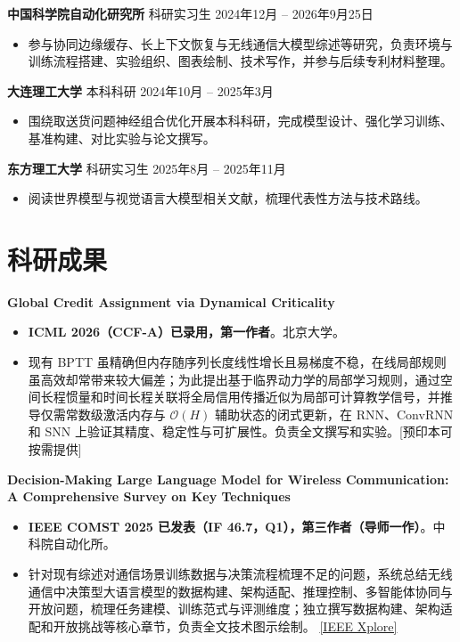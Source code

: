 \documentclass[a4paper,10pt]{ctexart}
\begin{document}
\noindent\textbf{中国科学院自动化研究所} \quad 科研实习生 \hfill 2024年12月 -- 2026年9月25日
\begin{itemize}[leftmargin=1.25em, itemsep=0.08em, topsep=0.06em, parsep=0pt]
    \item 参与协同边缘缓存、长上下文恢复与无线通信大模型综述等研究，负责环境与训练流程搭建、实验组织、图表绘制、技术写作，并参与后续专利材料整理。
\end{itemize}
\vspace{0.04em}

\noindent\textbf{大连理工大学} \quad 本科科研 \hfill 2024年10月 -- 2025年3月
\begin{itemize}[leftmargin=1.25em, itemsep=0.08em, topsep=0.06em, parsep=0pt]
    \item 围绕取送货问题神经组合优化开展本科科研，完成模型设计、强化学习训练、基准构建、对比实验与论文撰写。
\end{itemize}
\vspace{0.04em}

\noindent\textbf{东方理工大学} \quad 科研实习生 \hfill 2025年8月 -- 2025年11月
\begin{itemize}[leftmargin=1.25em, itemsep=0.08em, topsep=0.06em, parsep=0pt]
    \item 阅读世界模型与视觉语言大模型相关文献，梳理代表性方法与技术路线。
\end{itemize}

\section{科研成果}
\noindent\textbf{Global Credit Assignment via Dynamical Criticality}
\begin{itemize}[leftmargin=1.15em, itemsep=0.02em, topsep=0.03em, parsep=0pt]
    \item \textbf{ICML 2026（CCF-A）已录用，第一作者}。北京大学。
    \item 现有 BPTT 虽精确但内存随序列长度线性增长且易梯度不稳，在线局部规则虽高效却常带来较大偏差；为此提出基于临界动力学的局部学习规则，通过空间长程惯量和时间长程关联将全局信用传播近似为局部可计算教学信号，并推导仅需常数级激活内存与 $\mathcal{O}(H)$ 辅助状态的闭式更新，在 RNN、ConvRNN 和 SNN 上验证其精度、稳定性与可扩展性。负责全文撰写和实验。[预印本可按需提供]
\end{itemize}
\vspace{0.03em}

\noindent\textbf{Decision-Making Large Language Model for Wireless Communication: A Comprehensive Survey on Key Techniques}
\begin{itemize}[leftmargin=1.15em, itemsep=0.02em, topsep=0.03em, parsep=0pt]
    \item \textbf{IEEE COMST 2025 已发表（IF 46.7，Q1），第三作者（导师一作）}。中科院自动化所。
    \item 针对现有综述对通信场景训练数据与决策流程梳理不足的问题，系统总结无线通信中决策型大语言模型的数据构建、架构适配、推理控制、多智能体协同与开放问题，梳理任务建模、训练范式与评测维度；独立撰写数据构建、架构适配和开放挑战等核心章节，负责全文技术图示绘制。 \href{https://ieeexplore.ieee.org/document/11180008/}{[IEEE Xplore]}
\end{itemize}
\vspace{0.03em}
\end{document}
